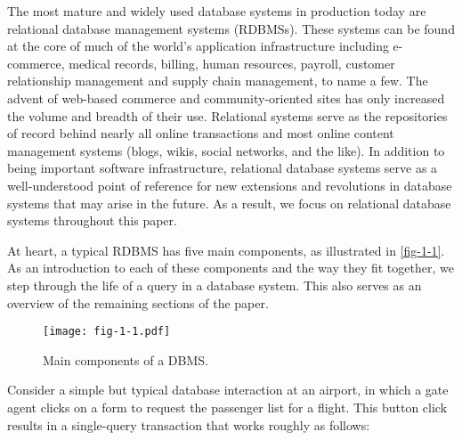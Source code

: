\documentclass[b5paper,11pt,twoside,openright]{book}
\begin{document}
The most mature and widely used database systems in production today are
relational database management systems (RDBMSs). These systems can be
found at the core of much of the world's application infrastructure
including e-commerce, medical records, billing, human resources,
payroll, customer relationship management and supply chain management,
to name a few. The advent of web-based commerce and community-oriented
sites has only increased the volume and breadth of their use. Relational
systems serve as the repositories of record behind nearly all online
transactions and most online content management systems (blogs, wikis,
social networks, and the like). In addition to being important software
infrastructure, relational database systems serve as a well-understood point of reference for new extensions and revolutions
in database systems that may arise in the future. As a result, we focus
on relational database systems throughout this paper.

At heart, a typical RDBMS has five main components, as illustrated in
\autoref{fig-1-1}. As an introduction to each of these components and the way
they fit together, we step through the life of a query in a database
system. This also serves as an overview of the remaining sections of the
paper.

\begin{figure}
\texttt{[image: fig-1-1.pdf]}

\caption{Main components of a DBMS.\label{fig-1-1}}
\end{figure}

Consider a simple but typical database interaction at an airport, in
which a gate agent clicks on a form to request the passenger list for a
flight. This button click results in a single-query transaction that
works roughly as follows:
\end{document}
